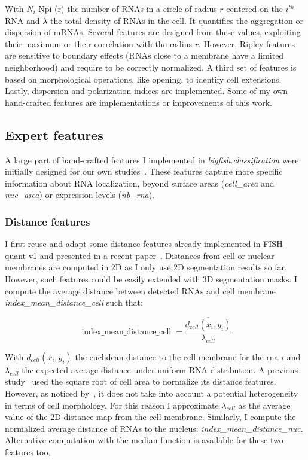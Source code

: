 \noindent
With $N_i$ Npi (r) the number of \ac{RNA}s in a circle of radius $r$ centered on the $i^{th}$ \ac{RNA} and $\lambda$ the total density of \ac{RNA}s in the cell.
It quantifies the aggregation or dispersion of mRNAs.
Several features are designed from these values, exploiting their maximum or their correlation with the radius $r$.
However, Ripley features are sensitive to boundary effects (\ac{RNA}s close to a membrane have a limited neighborhood) and require to be correctly normalized.
A third set of features is based on morphological operations, like opening, to identify cell extensions.
Lastly, dispersion and polarization indices are implemented.
Some of my own hand-crafted features are implementations or improvements of this work.

\subsection{Expert features}
\label{subsec:expert_features}

A large part of hand-crafted features I implemented in \emph{bigfish.classification} were initially designed for our own studies~\cite{CHOUAIB_2020,safieddine_choreography_2021,pichon_kinesin_2021}.
These features capture more specific information about \ac{RNA} localization, beyond surface areas (\emph{cell\_area} and \emph{nuc\_area}) or expression levels (\emph{nb\_rna}).

\subsubsection{Distance features}

I first reuse and adapt some distance features already implemented in FISH-quant v1 and presented in a recent paper~\cite{samacoits_computational_2018}.
Distances from cell or nuclear membranes are computed in 2D as I only use 2D segmentation results so far.
However, such features could be easily extended with 3D segmentation masks.
I compute the average distance between detected \ac{RNA}s and cell membrane \emph{index\_mean\_distance\_cell} such that:

\begin{equation}
	{\displaystyle \operatorname{index\_mean\_distance\_cell} = \frac{\overline{d_{cell}(x_i, y_i)}}{\lambda_{cell}}}
\end{equation}

\noindent
With $d_{cell}(x_i, y_i)$ the euclidean distance to the cell membrane for the rna $i$ and $\lambda_{cell}$ the expected average distance under uniform \ac{RNA} distribution.
A previous study~\cite{battich_control_2015} used the square root of cell area to normalize its distance features.
However, as noticed by~\cite{samacoits_computational_2018}, it does not take into account a potential heterogeneity in terms of cell morphology.
For this reason I approximate $\lambda_{cell}$ as the average value of the 2D distance map from the cell membrane.
Similarly, I compute the normalized average distance of \ac{RNA}s to the nucleus: \emph{index\_mean\_distance\_nuc}.
Alternative computation with the median function is available for these two features too.

